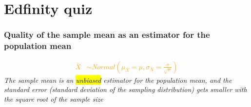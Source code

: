 \documentclass[t,compress,mathserif]{beamer}
\newcommand{\soln}[1]{\textit{#1}}
\begin{document}

\section{Edfinity quiz}

\begin{frame}
\frametitle{Quality of the sample mean as an estimator for the population mean}
\textcolor{orange}{
\begin{align*}
 \bar{X} &\sim Normal\left(\mu_{\bar{X}}=\mu, \sigma_{\bar{X}}=\frac{\sigma}{\sqrt{n}}\right)
\end{align*}
}
\soln{
The sample mean is an \hl{unbiased} estimator for the population mean, and the standard error (standard deviation of the sampling distribution) gets smaller with the square root of the sample size}

\end{frame}








\end{document}
